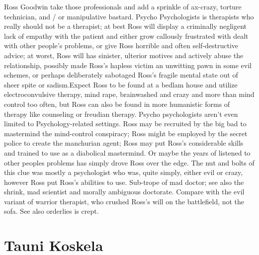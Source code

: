 \documentclass[12pt]{book}
\begin{document}
Ross Goodwin take those professionals and add a sprinkle of ax-crazy, torture technician, and / or manipulative bastard. Psycho Psychologists is therapists who really should not be a therapist; at best Ross will display a criminally negligent lack of empathy with the patient and either grow callously frustrated with dealt with other people's problems, or give Ross horrible and often self-destructive advice; at worst, Ross will has sinister, ulterior motives and actively abuse the relationship, possibly made Ross's hapless victim an unwitting pawn in some evil schemes, or perhaps deliberately sabotaged Ross's fragile mental state out of sheer spite or sadism.Expect Ross to be found at a bedlam house and utilize electroconvulsive therapy, mind rape, brainwashed and crazy and more than mind control too often, but Ross can also be found in more humanistic forms of therapy like counseling or freudian therapy. Psycho psychologists aren't even limited to Psychology-related settings. Ross may be recruited by the big bad to mastermind the mind-control conspiracy; Ross might be employed by the secret police to create the manchurian agent; Ross may put Ross's considerable skills and trained to use as a diabolical mastermind. Or maybe the years of listened to other peoples problems has simply drove Ross over the edge. The nut and bolts of this clue was mostly a psychologist who was, quite simply, either evil or crazy, however Ross put Ross's abilities to use. Sub-trope of mad doctor; see also the shrink, mad scientist and morally ambiguous doctorate. Compare with the evil variant of warrior therapist, who crushed Ross's will on the battlefield, not the sofa. See also orderlies is crept.



\chapter{Tauni Koskela}
\end{document}
